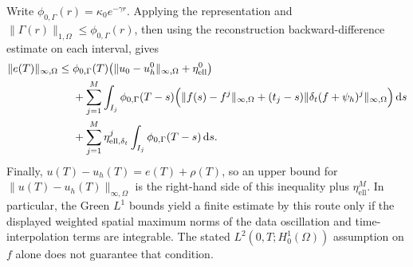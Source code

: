 \documentclass[11pt]{article}
\begin{document}
Write \(\phi_{0,\Gamma}(r)=\kappa_0e^{-\gamma r}\). Applying the representation and \(\|\Gamma(r)\|_{1,\Omega}\leq\phi_{0,\Gamma}(r)\), then using the reconstruction backward-difference estimate on each interval, gives
\[
\begin{aligned}
\|e(T)\|_{\infty,\Omega}\leq{}&
\phi_{0,\Gamma}(T)\bigl(\|u_0-u_h^0\|_{\infty,\Omega}+\eta_{\mathrm{ell}}^0\bigr)\\
&+\sum_{j=1}^{M}\int_{I_j}\phi_{0,\Gamma}(T-s)
\Bigl(\|f(s)-f^j\|_{\infty,\Omega}
 +(t_j-s)\|\delta_t(f+\psi_h)^j\|_{\infty,\Omega}\Bigr)\,\mathrm ds\\
&+\sum_{j=1}^{M}\eta_{\mathrm{ell},\delta_t}^j
\int_{I_j}\phi_{0,\Gamma}(T-s)\,\mathrm ds.
\end{aligned}
\]
Finally, \(u(T)-u_h(T)=e(T)+\rho(T)\), so an upper bound for \(\|u(T)-u_h(T)\|_{\infty,\Omega}\) is the right-hand side of this inequality plus \(\eta_{\mathrm{ell}}^M\). In particular, the Green \(L^1\) bounds yield a finite estimate by this route only if the displayed weighted spatial maximum norms of the data oscillation and time-interpolation terms are integrable. The stated \(L^2(0,T;H_0^1(\Omega))\) assumption on \(f\) alone does not guarantee that condition.
\end{document}
